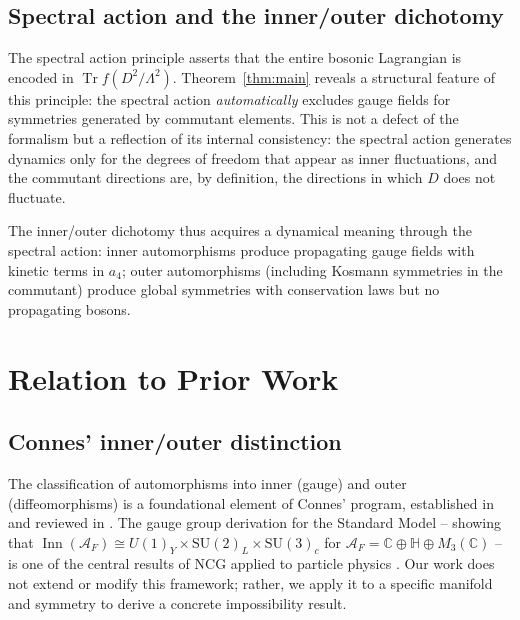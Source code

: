 \documentclass[12pt]{article}
\theoremstyle{definition}
\theoremstyle{remark}
\newcommand{\Alg}{\mathcal{A}}
\newcommand{\Tr}{\operatorname{Tr}}
\newcommand{\Inn}{\operatorname{Inn}}
\begin{document}
\subsection{Spectral action and the inner/outer dichotomy}
\label{subsec:saouter}

The spectral action principle \cite{ChamseddineConnes1996spectral} asserts that the entire bosonic Lagrangian is encoded in $\Tr f(D^2/\Lambda^2)$.  Theorem~\ref{thm:main} reveals a structural feature of this principle: the spectral action \emph{automatically} excludes gauge fields for symmetries generated by commutant elements.  This is not a defect of the formalism but a reflection of its internal consistency: the spectral action generates dynamics only for the degrees of freedom that appear as inner fluctuations, and the commutant directions are, by definition, the directions in which $D$ does not fluctuate.

The inner/outer dichotomy thus acquires a dynamical meaning through the spectral action: inner automorphisms produce propagating gauge fields with kinetic terms in $a_4$; outer automorphisms (including Kosmann symmetries in the commutant) produce global symmetries with conservation laws but no propagating bosons.


\section{Relation to Prior Work}
\label{sec:priorwork}

\subsection{Connes' inner/outer distinction}

The classification of automorphisms into inner (gauge) and outer (diffeomorphisms) is a foundational element of Connes' program, established in \cite{Connes1994book, Connes1996gravity} and reviewed in \cite{Connes2019spectral, ConnesMarcolli2008book, vanSuijlekom2015book}.  The gauge group derivation for the Standard Model -- showing that $\Inn(\Alg_F) \cong U(1)_Y \times \mathrm{SU}(2)_L \times \mathrm{SU}(3)_c$ for $\Alg_F = \mathbb{C} \oplus \mathbb{H} \oplus M_3(\mathbb{C})$ -- is one of the central results of NCG applied to particle physics \cite{CCM2007gravity}.  Our work does not extend or modify this framework; rather, we apply it to a specific manifold and symmetry to derive a concrete impossibility result.
\end{document}
